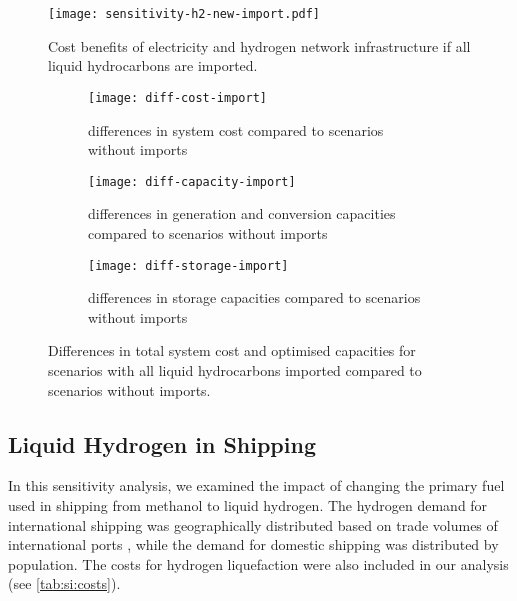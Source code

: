 \begin{SCfigure}
    \centering
    \texttt{[image: sensitivity-h2-new-import.pdf]}
    \caption{Cost benefits of electricity and hydrogen network infrastructure if all liquid hydrocarbons are imported.}
    \label{fig:sensitivity-imports}
\end{SCfigure}

\begin{figure}
    \centering
    \begin{subfigure}[t]{\textwidth}
        \centering
        \caption{differences in system cost compared to scenarios without imports}
        \texttt{[image: diff-cost-import]}
        \label{fig:sensitivity-import-cost}
    \end{subfigure}
    \begin{subfigure}[t]{\textwidth}
        \centering
        \caption{differences in generation and conversion capacities compared to scenarios without imports}
        \texttt{[image: diff-capacity-import]}
        \label{fig:sensitivity-import-cap}
    \end{subfigure}
    \begin{subfigure}[t]{\textwidth}
        \centering
        \caption{differences in storage capacities compared to scenarios without imports}
        \texttt{[image: diff-storage-import]}
        \label{fig:sensitivity-import-sto}
    \end{subfigure}
    \caption{Differences in total system cost and optimised capacities for scenarios with all liquid hydrocarbons imported compared to scenarios without imports.}
    \label{fig:sensitivity-import-diff}
\end{figure}


\subsection{Liquid Hydrogen in Shipping}
\label{sec:si:sensitivity-shipping}

In this sensitivity analysis, we examined the impact of changing the primary
fuel used in shipping from methanol to liquid hydrogen. The hydrogen demand for
international shipping was geographically distributed based on trade volumes of
international ports , while the demand for domestic
shipping was distributed by population. The costs for hydrogen liquefaction were
also included in our analysis (see \cref{tab:si:costs}).

